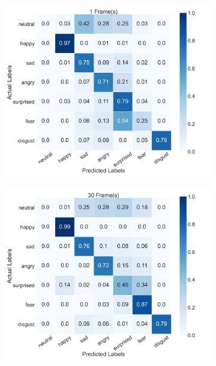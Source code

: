 \begin{figure}
    \centering
    \begin{subfigure}[b]{0.45\textwidth}
      \includegraphics[width=\textwidth]{res/conf_busso_1.png}
    \end{subfigure}
    \begin{subfigure}[b]{0.45\textwidth}
      \includegraphics[width=\textwidth]{res/conf_busso_30.png}
    \end{subfigure}
    \begin{subfigure}[b]{0.45\textwidth}

\end{subfigure}
\end{figure}
